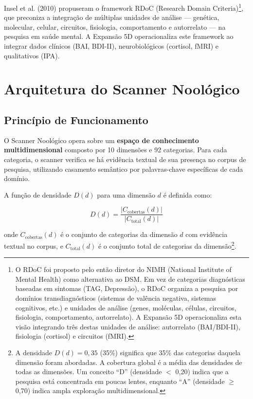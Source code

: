 \documentclass[12pt,a4paper]{article}
\begin{document}
Insel et al. (2010) propuseram o framework RDoC (Research Domain Criteria)\footnote{O RDoC foi proposto pelo então diretor do NIMH (National Institute of Mental Health) como alternativa ao DSM. Em vez de categorias diagnósticas baseadas em sintomas (TAG, Depressão), o RDoC organiza a pesquisa por domínios transdiagnósticos (sistemas de valência negativa, sistemas cognitivos, etc.) e unidades de análise (genes, moléculas, células, circuitos, fisiologia, comportamento, autorrelato). A Expansão 5D operacionaliza esta visão integrando três destas unidades de análise: autorrelato (BAI/BDI-II), fisiologia (cortisol) e circuitos (fMRI).}, que preconiza a integração de múltiplas unidades de análise --- genética, molecular, celular, circuitos, fisiologia, comportamento e autorrelato --- na pesquisa em saúde mental. A Expansão 5D operacionaliza este framework ao integrar dados clínicos (BAI, BDI-II), neurobiológicos (cortisol, fMRI) e qualitativos (IPA).

\section{Arquitetura do Scanner Noológico}

\subsection{Princípio de Funcionamento}

O Scanner Noológico opera sobre um \textbf{espaço de conhecimento multidimensional} composto por 10 dimensões e 92 categorias. Para cada categoria, o scanner verifica se há evidência textual de sua presença no corpus de pesquisa, utilizando casamento semântico por palavras-chave específicas de cada domínio.

A função de densidade $D(d)$ para uma dimensão $d$ é definida como:

\begin{equation}
  D(d) = \frac{|C_{\text{cobertas}}(d)|}{|C_{\text{total}}(d)|}
\end{equation}

onde $C_{\text{cobertas}}(d)$ é o conjunto de categorias da dimensão $d$ com evidência textual no corpus, e $C_{\text{total}}(d)$ é o conjunto total de categorias da dimensão\footnote{A densidade $D(d)=0,35$ (35\%) significa que 35\% das categorias daquela dimensão foram abordadas. A cobertura global é a média das densidades de todas as dimensões. Um conceito ``D'' (densidade $<$ 0,20) indica que a pesquisa está concentrada em poucas lentes, enquanto ``A'' (densidade $\geq$ 0,70) indica ampla exploração multidimensional.}.
\end{document}

